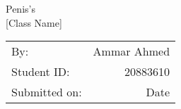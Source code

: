 \documentclass[12pt]{memoir}
\begin{document}
\begin{vplace}[0.7]
\begin{center}
    \LARGE{Penis's}\\[10pt]
    \Large {[Class Name]}\\[10pt]
\end{center}

\begin{center}
    \begin{tabular}{l r}
        By: &  Ammar Ahmed\\
        Student ID: & 20883610 \\
        Submitted on: & Date
    \end{tabular}
\end{center}
\end{vplace}
\newpage
\end{document}
